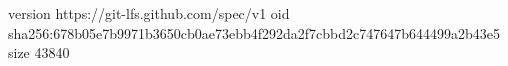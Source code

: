 version https://git-lfs.github.com/spec/v1
oid sha256:678b05e7b9971b3650cb0ae73ebb4f292da2f7cbbd2c747647b644499a2b43e5
size 43840

